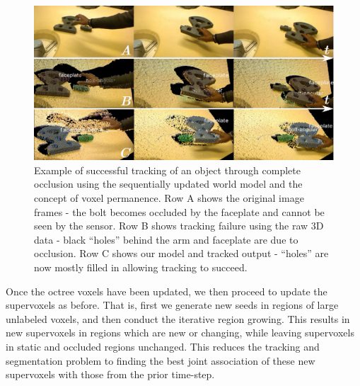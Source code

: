 \begin{figure}[!t]
\includegraphics[width=\linewidth]{figures/WorldModel/sequential.pdf}
   \caption[Voxel Permanence]{Example of successful tracking of an object through complete occlusion using the sequentially updated world model and the concept of voxel permanence. Row A shows the original image frames - the bolt becomes occluded by the faceplate and cannot be seen by the sensor. Row B shows tracking failure using the raw 3D data - black ``holes'' behind the arm and faceplate are due to occlusion. Row C shows our model and tracked output - ``holes'' are now mostly filled in allowing tracking to succeed.}
\label{fig:SequentialResults}
\end{figure}

Once the octree voxels have been updated, we then proceed to update the supervoxels as before. That is, first we generate new seeds in regions of large unlabeled voxels, and then conduct the iterative region growing. This results in new supervoxels in regions which are new or changing, while leaving supervoxels in static and occluded regions unchanged. This reduces the tracking and segmentation problem to finding the best joint association of these new supervoxels with those from the prior time-step.


